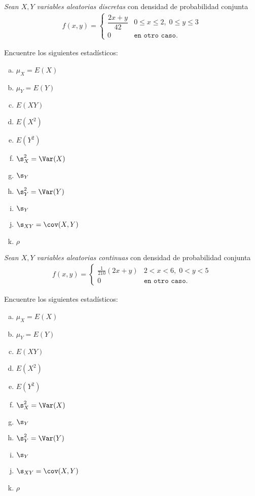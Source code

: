  \begin{exmp}
  \label{sol:3.25}
  \emph{Sean $X,Y$ variables aleatorias discretas} con densidad de probabilidad conjunta
  \begin{align}f(x,y)=
   \begin{cases}
    \dfrac{2x+y}{42} & 0\leq x \leq 2,\; 0\leq y \leq 3 \\
    0 & \texttt{en otro caso}.
   \end{cases}
  \end{align}
 \end{exmp}
 

Encuentre los siguientes estadísticos:
\begin{multicols}{3}
 \begin{enumerate}[(a)]
 \item $\mu_X = E(X)$ %
 \item $\mu_Y = E(Y)$ %
 \item $ E(XY)$ %
 \item $E(X^2)$ %
 \item $E(Y^2)$ %
 \item $\s^2_X = \Var(X)$ %
 \item $\s_{Y}$
 \item $\s^2_Y = \Var(Y)$ %
 \item $\s_{Y}$
 \item $\s_{XY} =\cov(X,Y)$ %
 \item $\rho$
\end{enumerate}
\end{multicols}






 \begin{exmp}
  \label{sol:3.26}
  \emph{Sean $X,Y$ variables aleatorias continuas} con densidad de probabilidad conjunta
  \begin{align}f(x,y)=
   \begin{cases}
    \frac{1}{210}(2x+y) & 2 < x < 6,\; 0<y<5 \\
    0 & \texttt{en otro caso}.
   \end{cases}
  \end{align}
 \end{exmp}

 

Encuentre los siguientes estadísticos:
\begin{multicols}{3}
 \begin{enumerate}[(a)]
 \item $\mu_X = E(X)$ %
 \item $\mu_Y = E(Y)$ %
 \item $ E(XY)$ %
 \item $E(X^2)$ %
 \item $E(Y^2)$ %
 \item $\s^2_X = \Var(X)$ %
 \item $\s_{Y}$
 \item $\s^2_Y = \Var(Y)$ %
 \item $\s_{Y}$
 \item $\s_{XY} =\cov(X,Y)$ %
 \item $\rho$
\end{enumerate}
\end{multicols}




